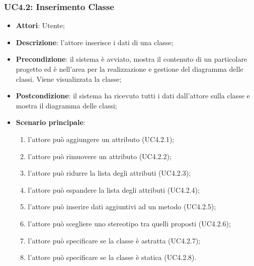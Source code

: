 \subsubsection{UC4.2: Inserimento Classe}
\label{UC4.2}
\begin{itemize}
	\item \textbf{Attori}: Utente;
	\item \textbf{Descrizione}: l'attore inserisce i dati di una classe;
	\item \textbf{Precondizione}: il sistema è avviato, mostra il contenuto di un particolare progetto ed è nell'area per la realizzazione e gestione del diagramma delle classi. Viene visualizzata la classe;
	\item \textbf{Postcondizione}: il sistema ha ricevuto tutti i dati dall'attore sulla classe e mostra il diagramma delle classi;
	\item \textbf{Scenario principale}:
	\begin{enumerate}
		\item l'attore può aggiungere un attributo (UC4.2.1);
		\item l'attore può rimuovere un attributo (UC4.2.2);
		\item l'attore può ridurre la lista degli attributi (UC4.2.3);
		\item l'attore può espandere la lista degli attributi (UC4.2.4);
		\item l'attore può inserire dati aggiuntivi ad un metodo (UC4.2.5);
		\item l'attore può scegliere uno stereotipo tra quelli proposti (UC4.2.6);%
		\item l'attore può specificare se la classe è astratta (UC4.2.7);
		\item l'attore può specificare se la classe è statica (UC4.2.8).
	\end{enumerate}
\end{itemize}

